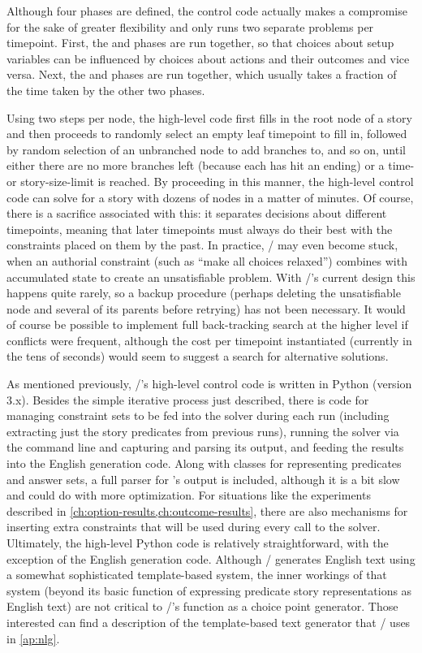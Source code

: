 Although four phases are defined, the control code actually makes a compromise for the sake of greater flexibility and only runs two separate problems per timepoint.
%
First, the  and  phases are run together, so that choices about setup variables can be influenced by choices about actions and their outcomes and vice versa.
%
Next, the  and  phases are run together, which usually takes a fraction of the time taken by the other two phases.


Using two steps per node, the high-level code first fills in the root node of a story and then proceeds to randomly select an empty leaf timepoint to fill in, followed by random selection of an unbranched node to add branches to, and so on, until either there are no more branches left (because each has hit an ending) or a time- or story-size-limit is reached.
%
By proceeding in this manner, the high-level control code can solve for a story with dozens of nodes in a matter of minutes.
%
Of course, there is a sacrifice associated with this: it separates decisions about different timepoints, meaning that later timepoints must always do their best with the constraints placed on them by the past.
%
In practice, \dunyazad/ may even become stuck, when an authorial constraint (such as ``make all choices relaxed'') combines with accumulated state to create an unsatisfiable problem.
%
With \dunyazad/'s current design this happens quite rarely, so a backup procedure (perhaps deleting the unsatisfiable node and several of its parents before retrying) has not been necessary.
%
It would of course be possible to implement full back-tracking search at the higher level if conflicts were frequent, although the cost per timepoint instantiated (currently in the tens of seconds) would seem to suggest a search for alternative solutions.


As mentioned previously, \dunyazad/'s high-level control code is written in Python (version 3.x).
%
Besides the simple iterative process just described, there is code for managing constraint sets to be fed into the solver during each run (including extracting just the story predicates from previous runs), running the solver via the command line and capturing and parsing its output, and feeding the results into the English generation code.
%
Along with classes for representing predicates and answer sets, a full parser for 's output is included, although it is a bit slow and could do with more optimization.
%
For situations like the experiments described in \cref{ch:option-results,ch:outcome-results}, there are also mechanisms for inserting extra constraints that will be used during every call to the solver.
%
Ultimately, the high-level Python code is relatively straightforward, with the exception of the English generation code.
%
Although \dunyazad/ generates English text using a somewhat sophisticated template-based system, the inner workings of that system (beyond its basic function of expressing predicate story representations as English text) are not critical to \dunyazad/'s function as a choice point generator.
%
Those interested can find a description of the template-based text generator that \dunyazad/ uses in \cref{ap:nlg}.



